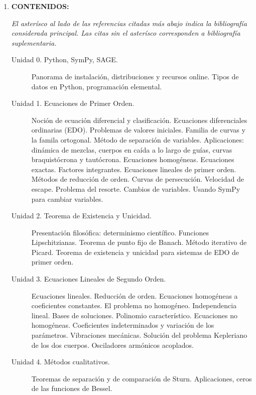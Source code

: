 \documentclass[12pt]{article}
\begin{document}
\begin{enumerate}

\item\textbf{ CONTENIDOS:}

\emph{
El asterísco al lado de las referencias citadas más abajo indica la bibliografía considerada principal. Las citas sin el asterísco corresponden a bibliografía suplementaria.}

\begin{description}
 \item[Unidad 0. Python, SymPy, SAGE.] Panorama de instalación, distribuciones y recursos online. Tipos de datos en Python, programación elemental.

\item[Unidad 1. Ecuaciones de Primer Orden.]  Noción de ecuación diferencial y clasificación. Ecuaciones diferenciales ordinarias (EDO).   Problemas de valores iniciales. Familia de curvas y la famila ortogonal. Método de separación de variables. Aplicaciones: dinámica de mezclas, cuerpos en caída a lo largo de guías, curvas braquistócrona y tautócrona. Ecuaciones homogéneas. Ecuaciones exactas. Factores integrantes. Ecuaciones lineales de primer orden. Métodos de reducción de orden. Curvas de persecución. Velocidad de escape. Problema del resorte. Cambios de variables. Usando SymPy para cambiar variables.   \cite{simmons_esp, WilliamE.Boyce496}

\item[Unidad 2. Teorema de Existencia y Unicidad.] Presentación filosófica: determinismo científico. Funciones Lipschitzianas. Teorema de punto fijo de Banach. Método iterativo de Picard. Teorema de existencia y unicidad para sistemas de EDO de primer orden.\cite{simmons_esp, WilliamE.Boyce496, VladimirI.Arnold544, JorgeSotomayor513}

\item[Unidad 3. Ecuaciones Lineales de Segundo Orden.] Ecuaciones lineales. Reducción de orden. Ecuaciones homogéneas a coeficientes constantes. El problema no homogéneo. Independencia lineal. Bases de soluciones. Polinomio característico. Ecuaciones no homogéneas. Coeficientes indeterminados y variación de los parámetros. Vibraciones mecánicas. Solución del problema Kepleriano de los dos cuerpos. Osciladores armónicos acoplados. \cite{simmons_esp, WilliamE.Boyce496}

\item[Unidad 4. Métodos cualitativos.] Teoremas de separación y de comparación de Sturn. Aplicaciones, ceros de las funciones de Bessel.\cite{simmons_esp,JorgeSotomayor513}


\end{description}
\end{enumerate}
\end{document}

